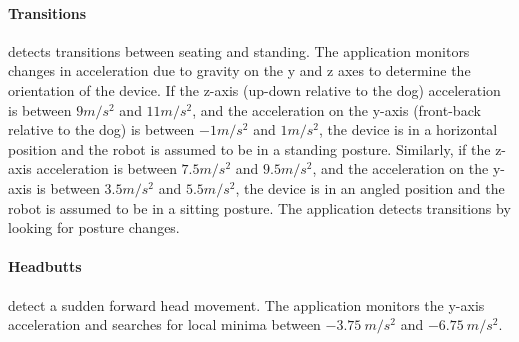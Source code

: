 \paragraph{Transitions} detects transitions between seating and
  standing.  The application monitors changes in acceleration due to
  gravity on the y and z axes to determine the orientation of the
  device. If the z-axis (up-down relative to the dog) acceleration is
  between $9 m/s^2$ and $11 m/s^2$, and the acceleration on the y-axis
  (front-back relative to the dog) is between $-1 m/s^2$ and $1
  m/s^2$, the device is in a horizontal position and the robot is
  assumed to be in a standing posture. Similarly, if the z-axis
  acceleration is between $7.5 m/s^2$ and $9.5 m/s^2$, and the
  acceleration on the y-axis is between $3.5 m/s^2$ and $5.5 m/s^2$,
  the device is in an angled position and the robot is assumed to be
  in a sitting posture. The application detects transitions by looking
  for posture changes.

\paragraph{Headbutts} detect a sudden forward head movement.  The
  application monitors the y-axis acceleration and searches for local
  minima between $-3.75\:m/s^2$ and $-6.75\:m/s^2$.
